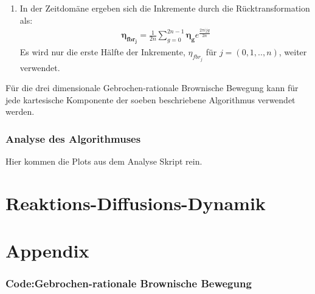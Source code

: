 \documentclass[
  a4paper,BCOR10mm,oneside,
  bibtotoc,idxtotoc,
  headsepline,footsepline,%
  fleqn,openbib
]{scrbook}
\begin{document}
\begin{enumerate}
 \item In der Zeitdomäne ergeben sich die Inkremente durch die Rücktransformation als:
 \begin{align}
 \boldsymbol{\eta_{fbr_j}}= \frac{1}{2n} \sum_{g=0}^{2n-1} \boldsymbol{\eta_g} e^{\frac{2 \pi i j g }{2n}}
 \end{align}
Es wird nur die erste Hälfte der Inkremente, $\eta_{fbr_j}$ für $j=(0,1,..,n)$, weiter verwendet.
\end{enumerate}
Für die drei dimensionale Gebrochen-rationale Brownische Bewegung kann für jede kartesische Komponente der soeben beschriebene Algorithmus verwendet werden. 
\subsection{Analyse des Algorithmuses}
Hier kommen die Plots  aus dem Analyse Skript rein.
\chapter{Reaktions-Diffusions-Dynamik}
\chapter{Appendix}
\subsection{Code:Gebrochen-rationale Brownische Bewegung}


\nocite{}



\end{document}
